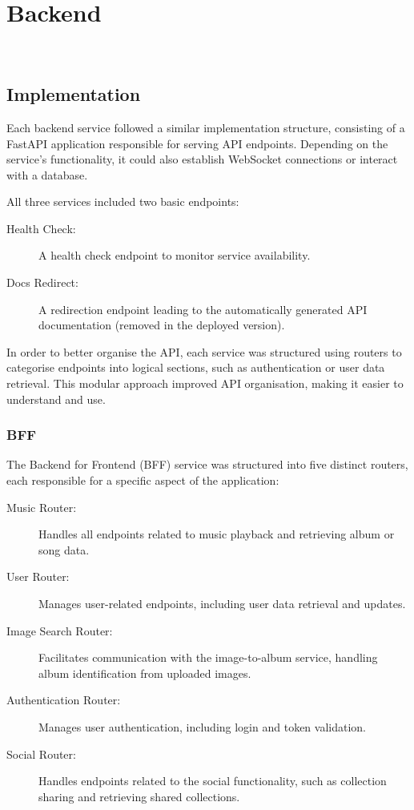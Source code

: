 \section{Backend}~\label{sec:backend-development}
\subsection{Implementation}
Each backend service followed a similar implementation structure, consisting of a FastAPI application responsible for serving API endpoints. Depending on the service's functionality, it could also establish WebSocket connections or interact with a database.

All three services included two basic endpoints:
\begin{description}
    \item[Health Check:] A health check endpoint to monitor service availability.
    \item[Docs Redirect:] A redirection endpoint leading to the automatically generated API documentation (removed in the deployed version).
\end{description}

In order to better organise the API, each service was structured using routers to categorise endpoints into logical sections, such as authentication or user data retrieval. This modular approach improved API organisation, making it easier to understand and use.

\subsubsection{BFF}
The Backend for Frontend (BFF) service was structured into five distinct routers, each responsible for a specific aspect of the application:

\begin{description}
    \item[Music Router:] Handles all endpoints related to music playback and retrieving album or song data.
    \item[User Router:] Manages user-related endpoints, including user data retrieval and updates.
    \item[Image Search Router:] Facilitates communication with the image-to-album service, handling album identification from uploaded images.
    \item[Authentication Router:] Manages user authentication, including login and token validation.
    \item[Social Router:] Handles endpoints related to the social functionality, such as collection sharing and retrieving shared collections.
\end{description}

